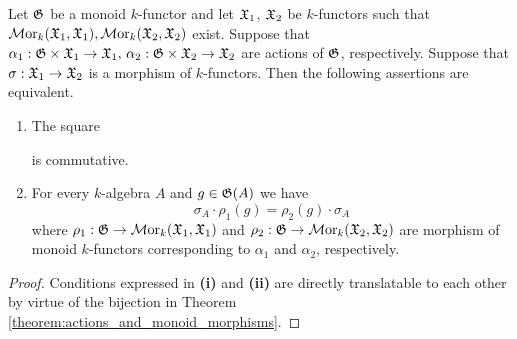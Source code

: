 \begin{proposition}\label{proposition:morphism_of_monoid_actions}
Let ${\mathfrak G}$ be a monoid $k$-functor and let ${\mathfrak X}_1$, ${\mathfrak X}_2$ be $k$-functors such that $\mathcal{M}\mathrm{or}_k({\mathfrak X}_1,{\mathfrak X}_1),\mathcal{M}\mathrm{or}_k({\mathfrak X}_2,{\mathfrak X}_2)$ exist. Suppose that $\alpha_1:{\mathfrak G}\times {\mathfrak X}_1 \rightarrow {\mathfrak X}_1,\,\alpha_2:{\mathfrak G}\times {\mathfrak X}_2 \rightarrow {\mathfrak X}_2$ are actions of ${\mathfrak G}$, respectively. Suppose that $\sigma:{\mathfrak X}_1\rightarrow {\mathfrak X}_2$ is a morphism of $k$-functors. Then the following assertions are equivalent.
\begin{enumerate}[label=\emph{\textbf{(\roman*)}}, leftmargin=3.0em]
\item The square
\begin{center}
\end{center}
is commutative.
\item For every $k$-algebra $A$ and $g\in {\mathfrak G}(A)$ we have
$$\sigma_A \cdot \rho_1(g) = \rho_2(g) \cdot \sigma_A$$
where $\rho_1:{\mathfrak G}\rightarrow \mathcal{M}\mathrm{or}_k({\mathfrak X}_1,{\mathfrak X}_1)$ and $\rho_2:{\mathfrak G}\rightarrow \mathcal{M}\mathrm{or}_{k}({\mathfrak X}_2,{\mathfrak X}_2)$ are morphism of monoid $k$-functors corresponding to $\alpha_1$ and $\alpha_2$, respectively.
\end{enumerate}
\end{proposition}
\begin{proof}
Conditions expressed in \textbf{(i)} and \textbf{(ii)} are directly translatable to each other by virtue of the bijection in Theorem \ref{theorem:actions_and_monoid_morphisms}. 
\end{proof}

